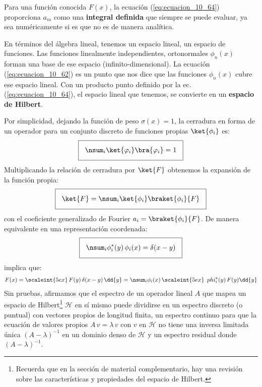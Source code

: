 \par
Para una función conocida $F(x)$, la ecuación (\ref{eq:ecuacion_10_64}) proporciona $a_{m}$ como una \textbf{integral definida} que siempre se puede evaluar, ya sea numéricamente si es que no es de manera analítica.
\par
En términos del álgebra lineal, tenemos un espacio lineal, un espacio de funciones. Las funciones linealmente independientes, ortonormales $\phi_{n}(x)$ forman una base de ese espacio (infinito-dimensional). La ecuación (\ref{eq:ecuacion_10_62}) es un punto que nos dice que las funciones $\phi_{n}(x)$ cubre ese espacio lineal. Con un producto punto definido por la ec. (\ref{eq:ecuacion_10_64}), el espacio lineal que tenemos, se convierte en un \textbf{espacio de Hilbert}.
\par
Por simplicidad, dejando la función de peso $\sigma (x) = 1$, la cerradura en forma de un operador para un conjunto discreto de funciones propias $\ket{\phi_{i}}$ es:
\begin{align*}
\setlength{\fboxsep}{3\fboxsep}\boxed{
\nsum_{i} \ket{\varphi_{i}} \bra{\varphi_{i}} =  1}
\end{align*}
Multiplicando la relación de cerradura por $\ket{F}$ obtenemos la expansión de la función propia:
\begin{align*}
\setlength{\fboxsep}{3\fboxsep}\boxed{
\ket{F} = \nsum_{i} \ket{\phi_{i}} \braket{\phi_{i}}{F}}
\end{align*}
con el coeficiente generalizado de Fourier $a_{i} = \braket{\phi_{i}}{F}$. De manera equivalente en una representación coordenada:
\begin{align*}
\setlength{\fboxsep}{3\fboxsep}\boxed{
\nsum_{i} \phi_{i}^{*} (y) \, \phi_{i} (x) = \delta (x - y)}
\end{align*}
implica que:
\begin{align*}
F(x) = \scaleint{5ex} \, F(y) \, \delta (x - y) \, \dd{y} = \nsum_{i} \phi_{i} (x) \, \scaleint{5ex} \, \ phi_{i}^{*} (y) \, F(y) \dd{y}
\end{align*}
Sin pruebas, afirmamos que el espectro de un operador lineal $A$ que mapea un espacio de Hilbert\footnote{Recuerda que en la sección de material complementario, hay una revisión sobre las características y propiedades del espacio de Hilbert.} $\mathcal{H}$ en sí mismo puede dividirse en un espectro discreto (o puntual) con vectores propios de longitud finita, un espectro continuo para que la ecuación de valores propios $A \, v = \lambda \, v$ con $v$ en $\mathcal{H}$ no tiene una inversa limitada única $(A - \lambda)^{-1}$ en un dominio denso de $\mathcal{H}$ y un espectro residual donde $(A - \lambda)^{-1}$.

